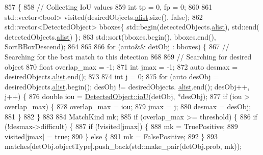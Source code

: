 \begin{DoxyCode}
857                                                                                                        \{
858             \textcolor{comment}{// Collecting IoU values}
859         \textcolor{keywordtype}{int} tp = 0, fp = 0;
860 
861         std::vector<bool> visited(desiredObjects.\hyperlink{classImageDescription_aa814580e2dd58fc3442ddd3549e6d81d}{alist}.size(), \textcolor{keyword}{false});
862         std::vector<DetectedObject> bboxes\{ std::begin(detectedObjects.\hyperlink{classImageDescription_aa814580e2dd58fc3442ddd3549e6d81d}{alist}), std::end(
      detectedObjects.\hyperlink{classImageDescription_aa814580e2dd58fc3442ddd3549e6d81d}{alist}) \};
863         std::sort(bboxes.begin(), bboxes.end(), SortBBoxDescend);
864 
865 
866         \textcolor{keywordflow}{for} (\textcolor{keyword}{auto}&& detObj : bboxes) \{
867                 \textcolor{comment}{// Searching for the best match to this detection}
868 
869             \textcolor{comment}{// Searching for desired object}
870             \textcolor{keywordtype}{float} overlap\_max = -1;
871             \textcolor{keywordtype}{int} jmax = -1;
872             \textcolor{keyword}{auto} desmax = desiredObjects.\hyperlink{classImageDescription_aa814580e2dd58fc3442ddd3549e6d81d}{alist}.end();
873 
874             \textcolor{keywordtype}{int} j = 0;
875             \textcolor{keywordflow}{for} (\textcolor{keyword}{auto} desObj = desiredObjects.\hyperlink{classImageDescription_aa814580e2dd58fc3442ddd3549e6d81d}{alist}.begin(); desObj != desiredObjects.
      \hyperlink{classImageDescription_aa814580e2dd58fc3442ddd3549e6d81d}{alist}.end(); desObj++, j++) \{
876                 \textcolor{keywordtype}{double} iou = \hyperlink{classDetectedObject_abc68e001862990d52703deff97fe0db6}{DetectedObject::ioU}(detObj, *desObj);
877                 \textcolor{keywordflow}{if} (iou > overlap\_max) \{
878                     overlap\_max = iou;
879                     jmax = j;
880                     desmax = desObj;
881                 \}
882             \}
883 
884             MatchKind mk;
885             \textcolor{keywordflow}{if} (overlap\_max >= threshold) \{
886                 \textcolor{keywordflow}{if} (!desmax->difficult) \{
887                     \textcolor{keywordflow}{if} (!visited[jmax]) \{
888                         mk = TruePositive;
889                         visited[jmax] = \textcolor{keyword}{true};
890                     \} \textcolor{keywordflow}{else} \{
891                         mk = FalsePositive;
892                     \}
893                     matches[detObj.objectType].push\_back(std::make\_pair(detObj.prob, mk));

\end{DoxyCode}
